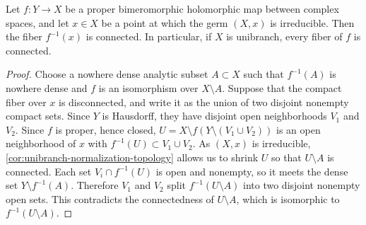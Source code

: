 \begin{theorem}\label{thm:unibranch-connected-fibers}
Let $f\colon Y\to X$ be a proper bimeromorphic holomorphic map between complex spaces, and let $x\in X$ be a point at which the germ $(X,x)$ is irreducible. Then the fiber $f^{-1}(x)$ is connected. In particular, if $X$ is unibranch, every fiber of $f$ is connected.
\end{theorem}
\begin{proof}
Choose a nowhere dense analytic subset $A\subset X$ such that $f^{-1}(A)$ is nowhere dense and $f$ is an isomorphism over $X\setminus A$. Suppose that the compact fiber over $x$ is disconnected, and write it as the union of two disjoint nonempty compact sets. Since $Y$ is Hausdorff, they have disjoint open neighborhoods $V_1$ and $V_2$. Since $f$ is proper, hence closed, $U=X\setminus f(Y\setminus(V_1\cup V_2))$ is an open neighborhood of $x$ with $f^{-1}(U)\subset V_1\cup V_2$. As $(X,x)$ is irreducible, \cref{cor:unibranch-normalization-topology} allows us to shrink $U$ so that $U\setminus A$ is connected. Each set $V_i\cap f^{-1}(U)$ is open and nonempty, so it meets the dense set $Y\setminus f^{-1}(A)$. Therefore $V_1$ and $V_2$ split $f^{-1}(U\setminus A)$ into two disjoint nonempty open sets. This contradicts the connectedness of $U\setminus A$, which is isomorphic to $f^{-1}(U\setminus A)$.
\end{proof}


